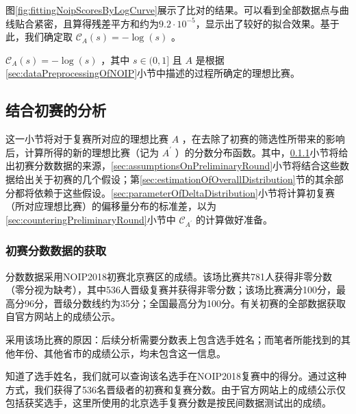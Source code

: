         图\ref{fig:fittingNoipScoresByLogCurve}展示了比对的结果。可以看到全部数据点与曲线贴合紧密，且算得残差平方和约为$9.2\cdot 10^{-5}$，显示出了较好的拟合效果。基于此，我们确定取 $\mathcal{C}_A(s)=-\log(s)$ 。

        \begin{proposition}
            $\mathcal{C}_A(s)=-\log(s)$ ，其中 $s\in(0,1]$ 且 $A$ 是根据\ref{sec:dataPreprocessingOfNOIP}小节中描述的过程所确定的理想比赛。
            \label{prop:scoreDistributionOfStandardizedNoip}
        \end{proposition}
            
    \subsection{结合初赛的分析}\label{sec:analysisOfBothRounds}

        这一小节将对于复赛所对应的理想比赛 $A$ ，在去除了初赛的筛选性所带来的影响后，计算所得的新的理想比赛（记为 $A^\prime$ ）的分数分布函数。其中，\ref{sec:dataOfPreliminaryRound}小节将给出初赛分数数据的来源，\ref{sec:assumptionsOnPreliminaryRound}小节将结合这些数据给出关于初赛的几个假设；第\ref{sec:estimationOfOverallDistribution}节的其余部分都将依赖于这些假设。\ref{sec:parameterOfDeltaDistribution}小节将计算初复赛（所对应理想比赛）的偏移量分布的标准差，以为\ref{sec:counteringPreliminaryRound}小节中 $\mathcal{C}_{A^\prime}$ 的计算做好准备。

        \subsubsection{初赛分数数据的获取}\label{sec:dataOfPreliminaryRound}

            分数数据采用NOIP2018初赛北京赛区的成绩。该场比赛共781人获得非零分数（零分视为缺考），其中536人晋级复赛并获得非零分数；该场比赛满分100分，最高分96分，晋级分数线约为35分；全国最高分为100分。有关初赛的全部数据获取自官方网站上的成绩公示。

            采用该场比赛的原因：后续分析需要分数表上包含选手姓名；而笔者所能找到的其他年份、其他省市的成绩公示，均未包含这一信息。

            知道了选手姓名，我们就可以查询该名选手在NOIP2018复赛中的得分。通过这种方式，我们获得了536名晋级者的初赛和复赛分数。由于官方网站上的成绩公示仅包括获奖选手，这里所使用的北京选手复赛分数是按民间数据测试出的成绩。

            \vspace{1.5ex}

